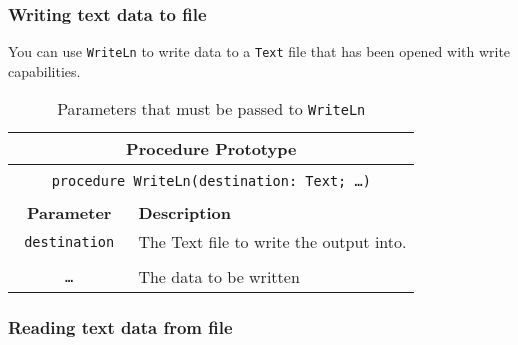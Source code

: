 
\clearpage
\subsubsection{Writing text data to file} %
\label{ssub:writing_text_data_to_file}

You can use \texttt{WriteLn} to write data to a \texttt{Text} file that has been opened with write capabilities.

\begin{table}[h]
  \centering
  \begin{tabular}{|c|p{9cm}|}
    \hline
    \multicolumn{2}{|c|}{\textbf{Procedure Prototype}} \\
    \hline
    \multicolumn{2}{|c|}{} \\
    \multicolumn{2}{|c|}{\texttt{procedure WriteLn(destination: Text; \ldots )}} \\
    \multicolumn{2}{|c|}{} \\
    \hline
    \textbf{Parameter} & \textbf{Description} \\
    \hline
    \texttt{ destination } & The Text file to write the output into.\\
    & \\
    \texttt{\ldots}   & The data to be written \\
    \hline
  \end{tabular}
  \caption{Parameters that must be passed to \texttt{WriteLn}}
  \label{tbl:FileWriteLn}
\end{table}



\subsubsection{Reading text data from file} %
\label{ssub:reading_text_data_from_file}

